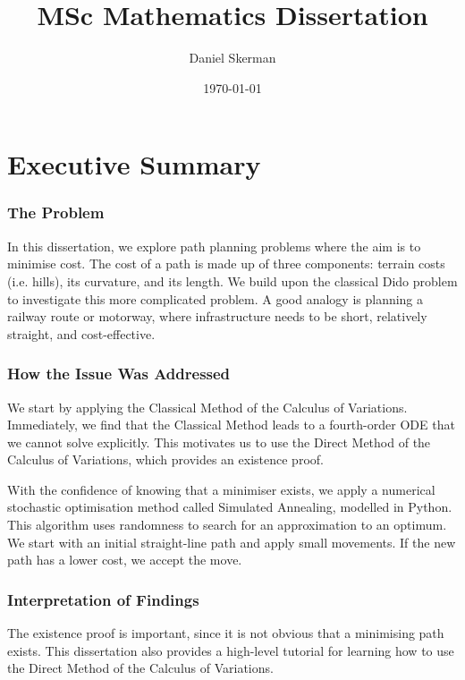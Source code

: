 \documentclass[12pt]{report}
\title{MSc Mathematics Dissertation}
\author{Daniel Skerman}
\date{\today}
\theoremstyle{plain}
\theoremstyle{definition}
\begin{document}



\chapter*{Executive Summary}

\subsection*{The Problem}

In this dissertation, we explore path planning problems where the aim is to minimise cost. The cost of a path is made up of three components: terrain costs (i.e. hills), its curvature, and its length. We build upon the classical Dido problem to investigate this more complicated problem. A good analogy is planning a railway route or motorway, where infrastructure needs to be short, relatively straight, and cost-effective.


\subsection*{How the Issue Was Addressed}

We start by applying the Classical Method of the Calculus of Variations. Immediately, we find that the Classical Method leads to a fourth-order ODE that we cannot solve explicitly. This motivates us to use the Direct Method of the Calculus of Variations, which provides an existence proof.

With the confidence of knowing that a minimiser exists, we apply a numerical stochastic optimisation method called Simulated Annealing, modelled in Python. This algorithm uses randomness to search for an approximation to an optimum. We start with an initial straight-line path and apply small movements. If the new path has a lower cost, we accept the move.

\subsection*{Interpretation of Findings}

The existence proof is important, since it is not obvious that a minimising path exists. This dissertation also provides a high-level tutorial for learning how to use the Direct Method of the Calculus of Variations.
\end{document}
